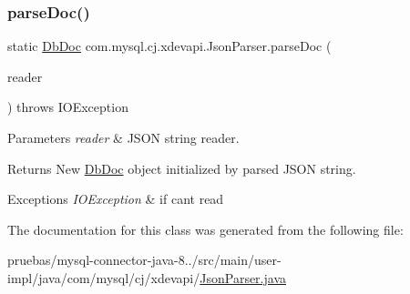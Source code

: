 \mbox{\label{classcom_1_1mysql_1_1cj_1_1xdevapi_1_1_json_parser_a09f9af593473756e34e7e87fb3022cc4}} 
\subsubsection{\texorpdfstring{parse\+Doc()}{parseDoc()}\hspace{0.1cm}{\footnotesize\ttfamily [2/2]}}
{\footnotesize\ttfamily static \mbox{\hyperlink{interfacecom_1_1mysql_1_1cj_1_1xdevapi_1_1_db_doc}{Db\+Doc}} com.\+mysql.\+cj.\+xdevapi.\+Json\+Parser.\+parse\+Doc (\begin{DoxyParamCaption}\item[{String\+Reader}]{reader }\end{DoxyParamCaption}) throws I\+O\+Exception\hspace{0.3cm}{\ttfamily [static]}}


\begin{DoxyParams}{Parameters}
{\em reader} & J\+S\+ON string reader. \\
\hline
\end{DoxyParams}
\begin{DoxyReturn}{Returns}
New \mbox{\hyperlink{interfacecom_1_1mysql_1_1cj_1_1xdevapi_1_1_db_doc}{Db\+Doc}} object initialized by parsed J\+S\+ON string. 
\end{DoxyReturn}

\begin{DoxyExceptions}{Exceptions}
{\em I\+O\+Exception} & if can\textquotesingle{}t read \\
\hline
\end{DoxyExceptions}


The documentation for this class was generated from the following file\+:\begin{DoxyCompactItemize}
\item 
pruebas/mysql-\/connector-\/java-\/8../src/main/user-\/impl/java/com/mysql/cj/xdevapi/\mbox{\hyperlink{_json_parser_8java}{Json\+Parser.\+java}}\end{DoxyCompactItemize}
